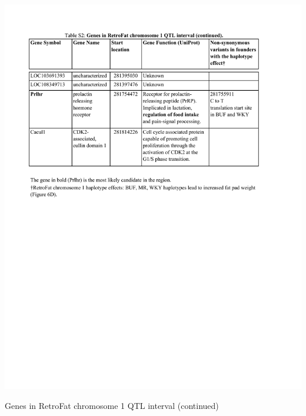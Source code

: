 \begin{table}
\centering
\includegraphics[page=1, trim={0in 5in 0in 0.95in}, clip, width=\textwidth]{figures/5-hsrats/supp_table_retrofat_chr1_extended.pdf}
\caption{Genes in RetroFat chromosome 1 QTL interval (continued) \label{tab:retrofat_chr1_genes_2}}
\end{table}

\clearpage

